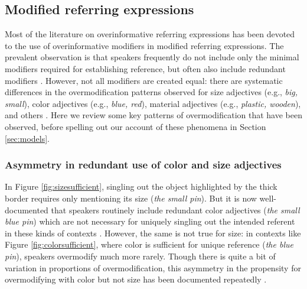 \documentclass[11pt]{article}
\newcommand{\figref}[1]{Figure \ref{#1}}
\newcommand{\sectionref}[1]{Section \ref{#1}}
\begin{document}
\subsection{Modified referring expressions}
\label{sec:modified}


Most of the literature on overinformative referring expressions has been devoted to the use of overinformative modifiers in modified referring expressions. The prevalent observation is that speakers frequently do not include only the minimal modifiers required for establishing reference, but often also include redundant modifiers \cite{Pechmann1989, nadig2002, Maes2004, Engelhardt2006, Arts2011, Koolen2011}. However, not all modifiers are created equal: there are systematic differences in the overmodification patterns observed for size adjectives (e.g., \emph{big, small}), color adjectives (e.g., \emph{blue, red}), material adjectives (e.g., \emph{plastic, wooden}), and others \cite{sedivy2003a}. Here we review some key patterns of overmodification that have been observed, before spelling out our account of these phenomena in \sectionref{sec:models}.



\subsubsection{Asymmetry in redundant use of color and size adjectives}
\label{sec:asymmetry}

 In \figref{fig:sizesufficient}, singling out the object highlighted by the thick border requires only mentioning its size (\emph{the small pin}). But it is now well-documented that speakers routinely include redundant color adjectives (\emph{the small blue pin}) which are not necessary for uniquely singling out the intended referent in these kinds of contexts \cite{Pechmann1989, Belke2002, gatt2011}. However, the same is not true for size: in contexts like \figref{fig:colorsufficient}, where color is sufficient for unique reference (\emph{the blue pin}), speakers overmodify much more rarely. Though there is quite a bit of variation in proportions of overmodification, this asymmetry in the propensity for overmodifying with color but not size has been documented repeatedly \cite{Pechmann1989, sedivy2003a,gatt2011, rubiofernandez2016,Westerbeek2015,Koolen2013}. 
 
\end{document}
